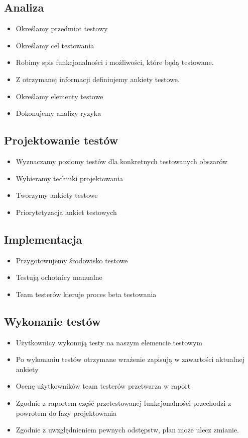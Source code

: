 \documentclass[12pt]{article}
\begin{document}
\subsection{Analiza}
\begin{itemize}
\item Określamy przedmiot testowy
\item Określamy cel testowania
\item Robimy spis funkcjonalności i możliwości, które będą testowane.
\item Z otrzymanej informacji definiujemy ankiety testowe.
\item Określamy elementy testowe
\item Dokonujemy analizy ryzyka
\end{itemize}

\subsection{Projektowanie testów}
\begin{itemize}
\item Wyznaczamy poziomy testów dla konkretnych testowanych obszarów
\item Wybieramy techniki projektowania 
\item Tworzymy ankiety testowe
\item Priorytetyzacja ankiet testowych
\end{itemize}

\subsection{Implementacja}
\begin{itemize}
\item Przygotowujemy środowisko testowe 
\item Testują ochotnicy manualne
\item Team testerów kieruje proces beta testowania
\end{itemize}

\subsection{Wykonanie testów}
\begin{itemize}
\item Użytkownicy wykonują testy na naszym elemencie testowym
\item Po wykonaniu testów otrzymane wrażenie zapisują w zawartości aktualnej ankiety
\item Ocenę użytkowników team testerów przetwarza w raport
\item Zgodnie z raportem część przetestowanej funkcjonalności przechodzi z powrotem do fazy projektowania
\item Zgodnie z uwzględnieniem pewnych odstępstw, plan może ulecz zmianie.
\end{itemize}
\end{document}
